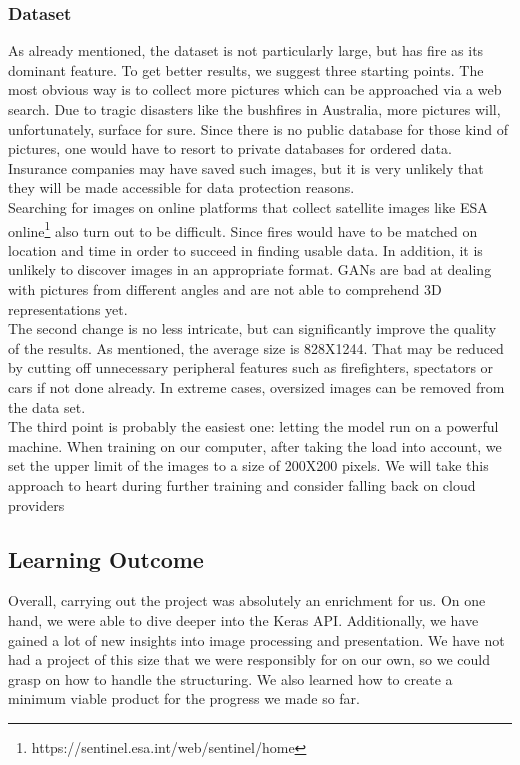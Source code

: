     \subsubsection{Dataset}
    As already mentioned, the dataset is not particularly large, but has fire as its dominant feature. To get better results, we
    suggest three starting points. The most obvious way is to collect more pictures which can be approached via a web search. Due to tragic disasters like the bushfires in Australia, more pictures will, unfortunately, surface for sure. Since there is no public database for those kind of pictures, one would have to resort to private databases for ordered data. Insurance companies may have saved such images, but it is very unlikely that they will be made accessible for data protection reasons. \\
    Searching for images on online platforms that collect satellite images like ESA online\footnote{https://sentinel.esa.int/web/sentinel/home} also turn out to be difficult. Since fires would have to be matched on location and time in order to succeed in finding usable data. In addition, it is unlikely to discover images in an appropriate format. GANs are bad at dealing with pictures from different angles and are not able to comprehend 3D representations yet. \\
    The second change is no less intricate, but can significantly improve the quality of the results. As mentioned, the average size is 828X1244. That may be reduced by cutting off unnecessary peripheral features such as firefighters, spectators or cars if not done already. In extreme cases, oversized images can be removed from the data set. \\
    The third point is probably the easiest one: letting the model run on a powerful machine. When training on our computer, after taking the load into account, we set the upper limit of the images to a size of 200X200 pixels. We will take this approach to heart during further training and consider falling back on cloud providers

	\subsection{Learning Outcome}
	Overall, carrying out the project was absolutely an enrichment for us. On one hand, we were able to dive deeper into the Keras API. Additionally, we have gained a lot of new insights into image processing and presentation. We have not had a project of this size that we were responsibly for on our own, so we could grasp on how to handle the structuring. We also learned how to create a minimum viable product for the progress we made so far.
	
